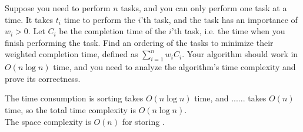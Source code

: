\problem{}
Suppose you need to perform $n$ tasks, and you can only perform one task at a time.  It takes $t_i$ time to perform the $i$'th task, and the task has an importance of $w_i > 0$.  Let $C_i$ be the completion time of the $i$'th task, i.e. the time when you finish performing the task.  Find an ordering of the tasks to minimize their weighted completion time, defined as $\sum_{i=1}^{n} w_i  C_i$.  Your algorithm should work in $O(n\log{n})$ time, and you need to analyze the algorithm's time complexity and prove its correctness. 

\solution{}














The time consumption is sorting takes $O(n\log n)$ time, and ...... takes $O(n)$ time,
so the total time complexity is $O(n\log n)$.\\
The space complexity is $O(n)$ for storing  .\\

\newpage